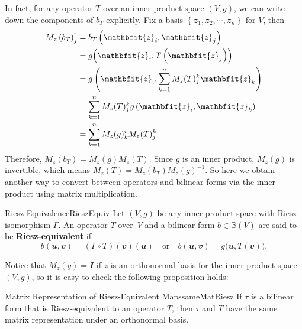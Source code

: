 \documentclass[math, code]{amznotes}
\theoremstyle{remark}
\newcommand{\I}{\mathbfit{I}}
\begin{document}
    In fact, for any operator $T$ over an inner product space $(V, g)$, we can write down the components of $b_T$ explicitly. Fix a basis $\left\{\mathbfit{z}_1, \mathbfit{z}_2, \cdots, \mathbfit{z}_n\right\}$ for $V$, then 
    \begin{align*}
        M_z\left(b_T\right)^i_j & = b_T\left(\mathbfit{z}_i, \mathbfit{z}_j\right) \\
        & = g\Bigl(\mathbfit{z}_i, T\left(\mathbfit{z}_j\right)\Bigr) \\
        & = g\left(\mathbfit{z}_i, \sum_{k = 1}^{n}M_z(T)^k_j\mathbfit{z}_k\right) \\
        & = \sum_{k = 1}^{n}M_z(T)^k_jg\left(\mathbfit{z}_i, \mathbfit{z}_k\right) \\
        & = \sum_{k = 1}^{n}M_z(g)^i_kM_z(T)^k_j.
    \end{align*}
    Therefore, $M_z\left(b_T\right) = M_z(g)M_z(T)$. Since $g$ is an inner product, $M_z(g)$ is invertible, which means $M_z(T) = M_z\left(b_T\right)M_z(g)^{-1}$. So here we obtain another way to convert between operators and bilinear forms via the inner product using matrix multiplication.
    \begin{dfnbox}{Riesz Equivalence}{RieszEquiv}
        Let $(V, g)$ be any inner product space with Riesz isomorphism $\Gamma$. An operator $T$ over~$V$ and a bilinear form $b \in \mathbb{B}(V)$ are said to be {\color{red} \textbf{Riesz-equivalent}} if 
        \begin{equation*}
            b(\mathbfit{u}, \mathbfit{v}) = (\Gamma \circ T)(\mathbfit{v})(\mathbfit{u}) \quad \textrm{or} \quad b(\mathbfit{u}, \mathbfit{v}) = g\bigl(\mathbfit{u}, T(\mathbfit{v})\bigr).
        \end{equation*} 
    \end{dfnbox}
    Notice that $M_z(g) = \I$ if $z$ is an orthonormal basis for the inner product space $(V, g)$, so it is easy to check the following proposition holds:
    \begin{probox}{Matrix Representation of Riesz-Equivalent Maps}{sameMatRiesz}
        If $\tau$ is a bilinear form that is Riesz-equivalent to an operator $T$, then $\tau$ and $T$ have the same matrix representation under an orthonormal basis.
    \end{probox}
\end{document}
